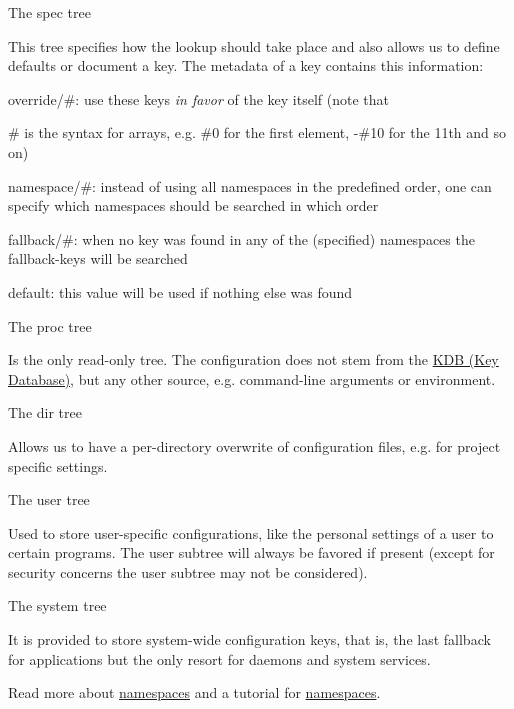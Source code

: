 \begin{DoxyItemize}
\item The {\ttfamily spec} tree

This tree specifies how the lookup should take place and also allows us to define defaults or document a key. The metadata of a key contains this information\+:
\begin{DoxyItemize}
\item {\ttfamily override/\#}\+: use these keys {\itshape in favor} of the key itself (note that
\item {\ttfamily \#} is the syntax for arrays, e.\+g. {\ttfamily \#0} for the first element, -\/{\ttfamily \#10} for the 11th and so on)
\item {\ttfamily namespace/\#}\+: instead of using all namespaces in the predefined order, one can specify which namespaces should be searched in which order
\item {\ttfamily fallback/\#}\+: when no key was found in any of the (specified) namespaces the {\ttfamily fallback}-\/keys will be searched
\item {\ttfamily default}\+: this value will be used if nothing else was found
\end{DoxyItemize}
\item The {\ttfamily proc} tree

Is the only read-\/only tree. The configuration does not stem from the \hyperlink{group__kdb}{K\+DB (Key Database)}, but any other source, e.\+g. command-\/line arguments or environment.
\item The {\ttfamily dir} tree

Allows us to have a per-\/directory overwrite of configuration files, e.\+g. for project specific settings.
\item The {\ttfamily user} tree

Used to store user-\/specific configurations, like the personal settings of a user to certain programs. The user subtree will always be favored if present (except for security concerns the user subtree may not be considered).
\item The {\ttfamily system} tree

It is provided to store system-\/wide configuration keys, that is, the last fallback for applications but the only resort for daemons and system services.
\end{DoxyItemize}

Read more about \hyperlink{md_doc_help_elektra-namespaces_doc_help_elektra-namespaces_md}{namespaces} and a tutorial for \hyperlink{doc_tutorials_namespaces_md}{namespaces}.

